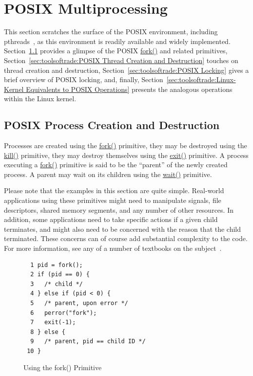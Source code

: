 \section{POSIX Multiprocessing}
\label{sec:toolsoftrade:POSIX Multiprocessing}

This section scratches the surface of the
POSIX environment, including pthreads~\cite{OpenGroup1997pthreads},
as this environment is readily available and widely implemented.
Section~\ref{sec:toolsoftrade:POSIX Process Creation and Destruction}
provides a glimpse of the POSIX \url{fork()} and related primitives,
Section~\ref{sec:toolsoftrade:POSIX Thread Creation and Destruction}
touches on thread creation and destruction,
Section~\ref{sec:toolsoftrade:POSIX Locking} gives a brief overview
of POSIX locking, and, finally,
Section~\ref{sec:toolsoftrade:Linux-Kernel Equivalents to POSIX Operations}
presents the analogous operations within the Linux kernel.

\subsection{POSIX Process Creation and Destruction}
\label{sec:toolsoftrade:POSIX Process Creation and Destruction}

Processes are created using the \url{fork()} primitive, they may
be destroyed using the \url{kill()} primitive, they may destroy
themselves using the \url{exit()} primitive.
A process executing a \url{fork()} primitive is said to be the ``parent''
of the newly created process.
A parent may wait on its children using the \url{wait()} primitive.

Please note that the examples in this section are quite simple.
Real-world applications using these primitives might need to manipulate
signals, file descriptors, shared memory segments, and any number of
other resources.
In addition, some applications need to take specific actions if a given
child terminates, and might also need to be concerned with the reason
that the child terminated.
These concerns can of course add substantial complexity to the code.
For more information, see any of a number of textbooks on the
subject~\cite{WRichardStevens1992}.

\begin{figure}[tbp]
{ \scriptsize
\begin{verbatim}
  1 pid = fork();
  2 if (pid == 0) {
  3   /* child */
  4 } else if (pid < 0) {
  5   /* parent, upon error */
  6   perror("fork");
  7   exit(-1);
  8 } else {
  9   /* parent, pid == child ID */
 10 }
\end{verbatim}
}
\caption{Using the fork() Primitive}
\label{fig:toolsoftrade:Using the fork() Primitive}
\end{figure}

